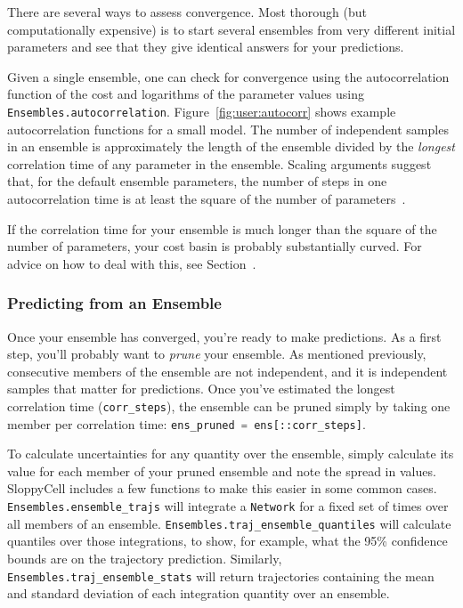 \documentclass[12pt]{article}
\makeatletter
\newcommand{\py}[1]{\lstinline[language=Python, showstringspaces=False]@#1@}
\makeatother
\begin{document}
There are several ways to assess convergence.
Most thorough (but computationally expensive) is to start several ensembles from very different initial parameters and see that they give identical answers for your predictions.

Given a single ensemble, one can check for convergence using the autocorrelation function of the cost and logarithms of the parameter values using \py{Ensembles.autocorrelation}.
Figure~\ref{fig:user:autocorr} shows example autocorrelation functions for a small model.
The number of independent samples in an ensemble is approximately the length of the ensemble divided by the \emph{longest} correlation time of any parameter in the ensemble.
Scaling arguments suggest that, for the default ensemble parameters, the number of steps in one autocorrelation time is at least the square of the number of parameters~\cite[Section 3.5.1]{bib:GutenkunstPhD}.

If the correlation time for your ensemble is much longer than the square of the number of parameters, your cost basin is probably substantially curved.
For advice on how to deal with this, see Section~\cite[Section 6.3]{bib:GutenkunstPhD}.

\subsubsection{Predicting from an Ensemble}

Once your ensemble has converged, you're ready to make predictions.
As a first step, you'll probably want to \emph{prune} your ensemble.
As mentioned previously, consecutive members of the ensemble are not independent, and it is independent samples that matter for predictions.
Once you've estimated the longest correlation time (\py{corr_steps}), the ensemble can be pruned simply by taking one member per correlation time: \py{ens_pruned = ens[::corr_steps]}.

To calculate uncertainties for any quantity over the ensemble, simply calculate its value for each member of your pruned ensemble and note the spread in values.
SloppyCell includes a few functions to make this easier in some common cases.
\py{Ensembles.ensemble_trajs} will integrate a \py{Network} for a fixed set of times over all members of an ensemble.
\py{Ensembles.traj_ensemble_quantiles} will calculate quantiles over those integrations, to show, for example, what the 95\% confidence bounds are on the trajectory prediction.
Similarly, \py{Ensembles.traj_ensemble_stats} will return trajectories containing the mean and standard deviation of each integration quantity over an ensemble.
\end{document}
